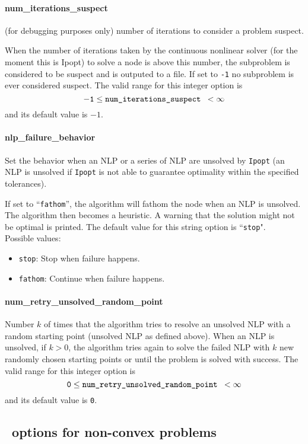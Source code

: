 \paragraph{num\_iterations\_suspect}
(for debugging purposes only) number of iterations to consider a problem
suspect.

When the number of iterations taken by the continuous nonlinear solver
(for the moment this is Ipopt) to solve a node is above this number,
the subproblem is
considered to be suspect and is outputed
to a file. If set to {\tt -1} no subproblem is ever considered suspect.
The valid range for this integer option is
$${\tt -1} \le \hbox{\tt num\_iterations\_suspect } <  \infty$$
and its default value is $-1$.


\paragraph{nlp\_failure\_behavior}
Set the behavior when an NLP or a series of NLP are unsolved by {\tt Ipopt}
(an NLP is unsolved if {\tt Ipopt} is not able to guarantee optimality within the specified tolerances).

 If set to ``{\tt fathom}'', the algorithm will fathom the
node when an NLP is unsolved. The algorithm then becomes a
heuristic. A warning that the solution might not
be optimal is printed.
The default value for this string option is ``{\tt stop}".
\\
Possible values:
\begin{itemize}
   \item {\tt stop}: Stop when failure happens.
   \item {\tt fathom}: Continue when failure happens.
\end{itemize}

\paragraph{num\_retry\_unsolved\_random\_point}
Number $k$ of times that the algorithm tries to resolve an unsolved NLP with a
random starting point (unsolved NLP as defined above).
 When an NLP is unsolved, if $k > 0$, the algorithm tries
again to solve the failed NLP with $k$ new
randomly chosen starting points  or until the
problem is solved with success. The valid range for this integer option is
$${\tt 0} \le \hbox{\tt num\_retry\_unsolved\_random\_point } <  \infty$$
and its default value is {\tt 0}.



\subsection{\Bonmin\ options for non-convex problems}

